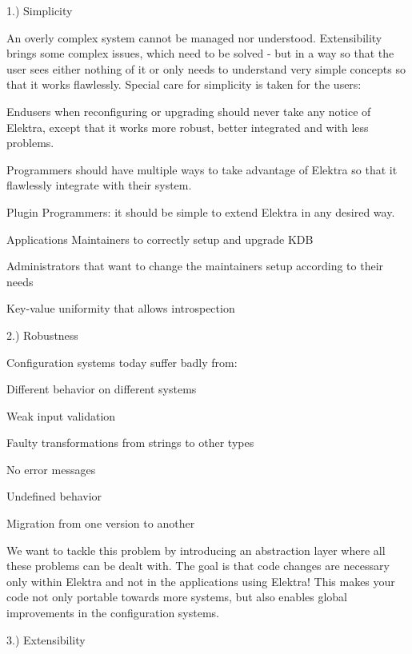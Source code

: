 1.) Simplicity

An overly complex system cannot be managed nor understood. Extensibility brings some complex issues, which need to be solved -\/ but in a way so that the user sees either nothing of it or only needs to understand very simple concepts so that it works flawlessly. Special care for simplicity is taken for the users\+:


\begin{DoxyItemize}
\item Endusers when reconfiguring or upgrading should never take any notice of Elektra, except that it works more robust, better integrated and with less problems.
\item Programmers should have multiple ways to take advantage of Elektra so that it flawlessly integrate with their system.
\item Plugin Programmers\+: it should be simple to extend Elektra in any desired way.
\item Application\textquotesingle{}s Maintainers to correctly setup and upgrade K\+DB
\item Administrators that want to change the maintainers\textquotesingle{} setup according to their needs
\item Key-\/value uniformity that allows introspection
\end{DoxyItemize}

2.) Robustness

Configuration systems today suffer badly from\+:


\begin{DoxyItemize}
\item Different behavior on different systems
\item Weak input validation
\item Faulty transformations from strings to other types
\item No error messages
\item Undefined behavior
\item Migration from one version to another
\end{DoxyItemize}

We want to tackle this problem by introducing an abstraction layer where all these problems can be dealt with. The goal is that code changes are necessary only within Elektra and not in the applications using Elektra! This makes your code not only portable towards more systems, but also enables global improvements in the configuration systems.

3.) Extensibility

